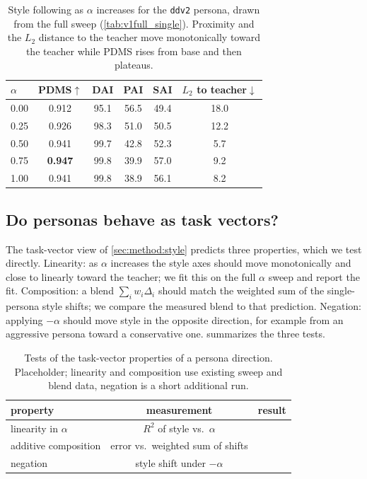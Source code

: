 \begin{table}[t]
    \centering
    \small
    \setlength{\tabcolsep}{5pt}
    \begin{tabular}{lccccc}
        \toprule
        $\alpha$ & PDMS$\uparrow$ & DAI & PAI & SAI & $L_2$ to teacher$\downarrow$ \\
        \midrule
        0.00 & 0.912 & 95.1 & 56.5 & 49.4 & 18.0 \\
        0.25 & 0.926 & 98.3 & 51.0 & 50.5 & 12.2 \\
        0.50 & 0.941 & 99.7 & 42.8 & 52.3 & 5.7 \\
        0.75 & \textbf{0.947} & 99.8 & 39.9 & 57.0 & 9.2 \\
        1.00 & 0.941 & 99.8 & 38.9 & 56.1 & 8.2 \\
        \bottomrule
    \end{tabular}
    \caption{Style following as $\alpha$ increases for the \texttt{ddv2} persona,
    drawn from the full sweep (\cref{tab:v1full_single}). Proximity and the $L_2$
    distance to the teacher move monotonically toward the teacher while PDMS rises from
    base and then plateaus.}
    \label{tab:following}
\end{table}

\subsection{Do personas behave as task vectors?}
\label{sec:exp:vector}
The task-vector view of \cref{sec:method:style} predicts three properties, which we
test directly. Linearity: as $\alpha$ increases the style axes should move
monotonically and close to linearly toward the teacher; we fit this on the full
$\alpha$ sweep and report the fit. Composition: a blend $\sum_i w_i \Delta_i$ should
match the weighted sum of the single-persona style shifts; we compare the measured
blend to that prediction. Negation: applying $-\alpha$ should move style in the
opposite direction, for example from an aggressive persona toward a conservative one.
 summarizes the three tests.

\begin{table}[t]
    \centering
    \small
    \setlength{\tabcolsep}{6pt}
    \begin{tabular}{lcc}
        \toprule
        property & measurement & result \\
        \midrule
        linearity in $\alpha$   & $R^2$ of style vs.\ $\alpha$        & \TODO{} \\
        additive composition    & error vs.\ weighted sum of shifts  & \TODO{} \\
        negation                & style shift under $-\alpha$        & \TODO{} \\
        \bottomrule
    \end{tabular}
    \caption{Tests of the task-vector properties of a persona direction.
    Placeholder; linearity and composition use existing sweep and blend data,
    negation is a short additional run.}
    \label{tab:vector}
\end{table}

